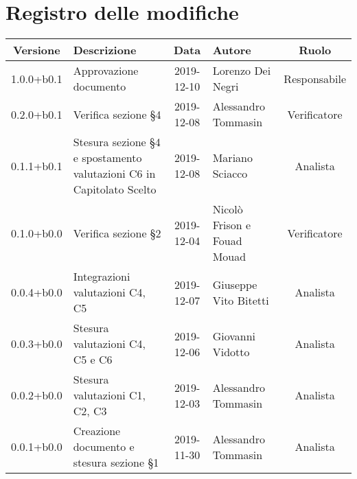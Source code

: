 \section*{Registro delle modifiche}

\begin{center}
	\begin{longtable}{|c|p{3cm}|c|p{4cm}|c|}
	\hline
	\rowcolor{lighter-grayer}
	\textbf{Versione} & \textbf{Descrizione} & \textbf{Data} & \textbf{Autore} & \textbf{Ruolo} \\
	\hline
	\endfirsthead

	1.0.0+b0.1 & Approvazione documento & 2019-12-10 & Lorenzo Dei Negri & Responsabile \\
	\hline
	0.2.0+b0.1 & Verifica sezione \S4 & 2019-12-08 & Alessandro Tommasin & Verificatore \\
	\hline
	0.1.1+b0.1 & Stesura sezione \S4 e spostamento valutazioni C6 in Capitolato Scelto & 2019-12-08 & Mariano Sciacco & Analista \\
	\hline
	0.1.0+b0.0 & Verifica sezione \S2 & 2019-12-04 & Nicolò Frison e Fouad Mouad & Verificatore \\
	\hline
	0.0.4+b0.0 & Integrazioni valutazioni C4, C5 & 2019-12-07 & Giuseppe Vito Bitetti & Analista \\
	\hline
	0.0.3+b0.0 & Stesura valutazioni C4, C5 e C6 & 2019-12-06 & Giovanni Vidotto & Analista \\
	\hline
	0.0.2+b0.0 & Stesura valutazioni C1, C2, C3 & 2019-12-03 & Alessandro Tommasin & Analista \\
	\hline
	0.0.1+b0.0 & Creazione documento e stesura sezione \S1 & 2019-11-30 & Alessandro Tommasin & Analista \\
	\hline

	\end{longtable}
\end{center}
